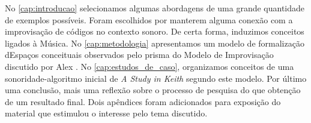 No \autoref{cap:introducao} selecionamos algumas abordagens de uma grande quantidade de exemplos possíveis. Foram escolhidos por manterem alguma conexão com a improvisação de códigos no contexto sonoro. De certa forma, induzimos conceitos ligados à Música.  No \autoref{cap:metodologia} apresentamos um modelo de formalização dEspaços conceituais observados pelo prisma do Modelo de Improvisação discutido por Alex . No \autoref{cap:estudos_de_caso}, organizamos conceitos de uma sonoridade-algoritmo inicial de \emph{A Study in Keith} segundo este modelo. Por último uma conclusão, mais uma reflexão sobre o processo de pesquisa do que obtenção de um resultado final. Dois apêndices foram adicionados para exposição do material que estimulou o interesse pelo tema discutido.